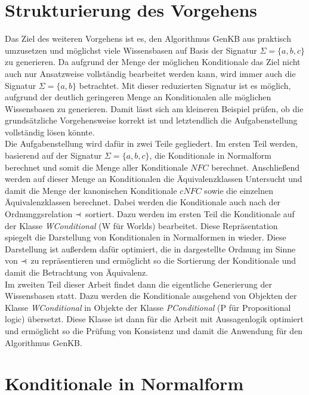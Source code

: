 \documentclass[12pt,a4paper]{article}
\newcommand\rdotl{\mathrel{%
    \mathchoice{\RQEQ}{\RQEQ}{\RQEQ}{\RQEQ}%
}}
\def\RQEQ{{%
    \setbox0\hbox{$\prec$}%
    \rlap{\hbox to \wd0{\hss \raisebox {0.01pt}{$\ \cdot$\hss}}}\box0
}}
\begin{document}
\section{Strukturierung des Vorgehens}
Das Ziel des weiteren Vorgehens ist es, den Algorithmus GenKB aus \cite{beierle19} praktisch umzusetzen und möglichst viele Wissensbasen auf Basis der Signatur $\Sigma=\{a,b,c\}$ zu generieren. Da aufgrund der Menge der möglichen Konditionale das Ziel nicht auch nur Ansatzweise vollständig bearbeitet werden kann, wird immer auch die Signatur $\Sigma=\{a,b\}$ betrachtet. Mit dieser reduzierten Signatur ist es möglich, aufgrund der deutlich geringeren Menge an Konditionalen alle möglichen Wissensbasen zu generieren. Damit lässt sich am kleineren Beispiel prüfen, ob die grundsätzliche Vorgehensweise korrekt ist und letztendlich die Aufgabenstellung vollständig lösen könnte. \\
Die Aufgabenstellung wird dafür in zwei Teile gegliedert. Im ersten Teil werden, basierend auf der Signatur $\Sigma=\{a,b,c\}$,  die Konditionale in Normalform berechnet und somit die Menge aller Konditionale $NFC$  berechnet. Anschließend werden auf dieser Menge an Konditionalen die Äquivalenzklassen Untersucht und damit die Menge der kanonischen Konditionale $cNFC$ sowie die einzelnen Äquivalenzklassen berechnet. Dabei werden die Konditionale auch nach der Ordnunggsrelation $\rdotl$ sortiert. Dazu werden im ersten Teil die Konditionale auf der Klasse \textit{WConditional} (W für Worlds) bearbeitet. Diese Repräsentation spiegelt die Darstellung von Konditionalen in Normalformen in \cite{beierle19} wieder. Diese Darstellung ist außerdem dafür optimiert, die in \cite{beierle19} dargestellte Ordnung im Sinne von $\rdotl$ zu repräsentieren und ermöglicht so die Sortierung der Konditionale und damit die Betrachtung von Äquivalenz. \\
Im zweiten Teil dieser Arbeit findet dann die eigentliche Generierung der Wissensbasen statt. Dazu werden die Konditionale ausgehend von Objekten der Klasse \textit{WConditional} in Objekte der Klasse \textit{PConditional} (P für Propositional logic) übersetzt. Diese Klasse ist dann für die Arbeit mit Aussagenlogik optimiert und ermöglicht so die Prüfung von Konsistenz und damit die Anwendung für den Algorithmus GenKB.
\section{Konditionale in Normalform}
\end{document}
